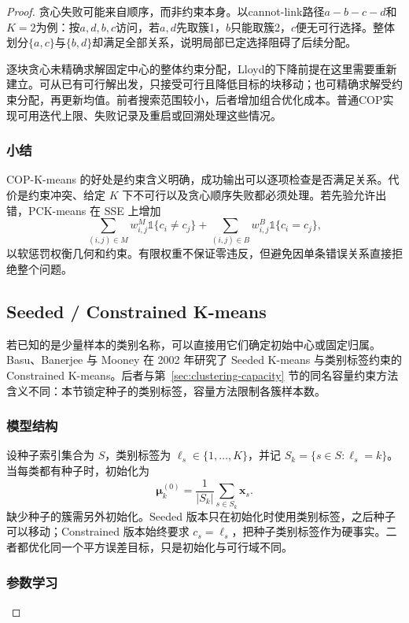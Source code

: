 \begin{proof}
贪心失败可能来自顺序，而非约束本身。以cannot-link路径$a-b-c-d$和$K=2$为例：按$a,d,b,c$访问，若$a,d$先取簇1，$b$只能取簇2，$c$便无可行选择。整体划分$\{a,c\}$与$\{b,d\}$却满足全部关系，说明局部已定选择阻碍了后续分配。

逐块贪心未精确求解固定中心的整体约束分配，Lloyd的下降前提在这里需要重新建立。可从已有可行解出发，只接受可行且降低目标的块移动；也可精确求解受约束分配，再更新均值。前者搜索范围较小，后者增加组合优化成本。普通COP实现可用迭代上限、失败记录及重启或回溯处理这些情况。

\subsubsection{小结}

COP-K-means 的好处是约束含义明确，成功输出可以逐项检查是否满足关系。代价是约束冲突、给定 $K$ 下不可行以及贪心顺序失败都必须处理。若先验允许出错，PCK-means 在 SSE 上增加
\[
 \sum_{(i,j)\in M}w_{i,j}^{M}\mathbb{1}\{c_i\ne c_j\}
 +\sum_{(i,j)\in B}w_{i,j}^{B}\mathbb{1}\{c_i=c_j\},
\]
以软惩罚权衡几何和约束。有限权重不保证零违反，但避免因单条错误关系直接拒绝整个问题。

\subsection{Seeded / Constrained K-means}
\label{sec:clustering-seeded}

若已知的是少量样本的类别名称，可以直接用它们确定初始中心或固定归属。Basu、Banerjee 与 Mooney 在 2002 年研究了 Seeded K-means 与类别标签约束的 Constrained K-means。后者与第~\ref{sec:clustering-capacity} 节的同名容量约束方法含义不同：本节锁定种子的类别标签，容量方法限制各簇样本数。

\subsubsection{模型结构}

设种子索引集合为 $S$，类别标签为 $\ell_s\in\{1,\ldots,K\}$，并记 $S_k=\{s\in S:\ell_s=k\}$。当每类都有种子时，初始化为
\[
 \bm{\mu}_k^{(0)}
 =\frac{1}{|S_k|}\sum_{s\in S_k}\bm{x}_s.
\]
缺少种子的簇需另外初始化。Seeded 版本只在初始化时使用类别标签，之后种子可以移动；Constrained 版本始终要求 $c_s=\ell_s$，把种子类别标签作为硬事实。二者都优化同一个平方误差目标，只是初始化与可行域不同。

\subsubsection{参数学习}


\end{proof}
